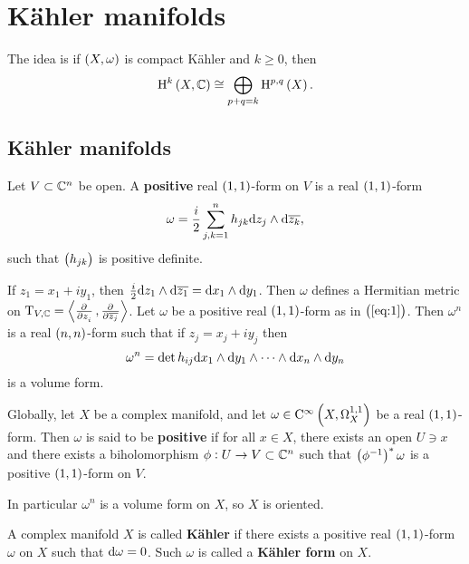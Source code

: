 \pagebreak

\section{K\"ahler manifolds}

The idea is if $ \br{X, \omega} $ is compact K\"ahler and $ k \ge 0 $, then
$$ \H^k\br{X, \CC} \cong \bigoplus_{p + q = k} \H^{p, q}\br{X}. $$

\subsection{K\"ahler manifolds}

\begin{definition}
Let $ V \subset \mathbb{C}^n $ be open. A \textbf{positive} real $ \br{1, 1} $-form on $ V $ is a real $ \br{1, 1} $-form
\begin{equation}
\label{eq:1}
\omega = \dfrac{i}{2}\sum_{j, k = 1}^n h_{jk}\mathrm{d} z_j \wedge \mathrm{d}\overline{z_k},
\end{equation}
such that $ \br{h_{jk}} $ is positive definite.
\end{definition}

If $ z_1 = x_1 + iy_1 $, then $ \tfrac{i}{2}\mathrm{d} z_1 \wedge \mathrm{d}\overline{z_1} = \mathrm{d} x_1 \wedge \mathrm{d} y_1 $. Then $ \omega $ defines a Hermitian metric on $ \T_{V, \CC} = \abr{\tpd{}{z_i}, \tpd{}{\overline{z_j}}} $. Let $ \omega $ be a positive real $ \br{1, 1} $-form as in $ \br{\ref{eq:1}} $. Then $ \omega^n $ is a real $ \br{n, n} $-form such that if $ z_j = x_j + iy_j $ then
$$ \omega^n = \det h_{ij}\mathrm{d} x_1 \wedge \mathrm{d} y_1 \wedge \dots \wedge \mathrm{d} x_n \wedge \mathrm{d} y_n $$
is a volume form.

\begin{definition}
Globally, let $ X $ be a complex manifold, and let $ \omega \in \C^\infty\br{X, \Omega_X^{1, 1}} $ be a real $ \br{1, 1} $-form. Then $ \omega $ is said to be \textbf{positive} if for all $ x \in X $, there exists an open $ U \ni x $ and there exists a biholomorphism $ \phi : U \to V \subset \mathbb{C}^n $ such that $ \br{\phi^{-1}}^*\omega $ is a positive $ \br{1, 1} $-form on $ V $.
\end{definition}

In particular $ \omega^n $ is a volume form on $ X $, so $ X $ is oriented.

\begin{definition}
A complex manifold $ X $ is called \textbf{K\"ahler} if there exists a positive real $ \br{1, 1} $-form $ \omega $ on $ X $ such that $ \mathrm{d}\omega = 0 $. Such $ \omega $ is called a \textbf{K\"ahler form} on $ X $.
\end{definition}


